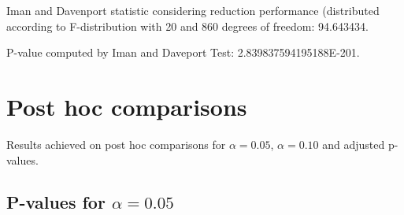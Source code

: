 \documentclass[a4paper,10pt]{article}
\begin{document}
\begin{landscape}
Iman and Davenport statistic considering reduction performance (distributed according to F-distribution with 20 and 860 degrees of freedom: 94.643434.

P-value computed by Iman and Daveport Test: 2.839837594195188E-201.\newline



\pagebreak

\section{Post hoc comparisons}

Results achieved on post hoc comparisons for $\alpha = 0.05$, $\alpha = 0.10$ and adjusted p-values.

\subsection{P-values for $\alpha=0.05$}


\end{landscape}
\end{document}
